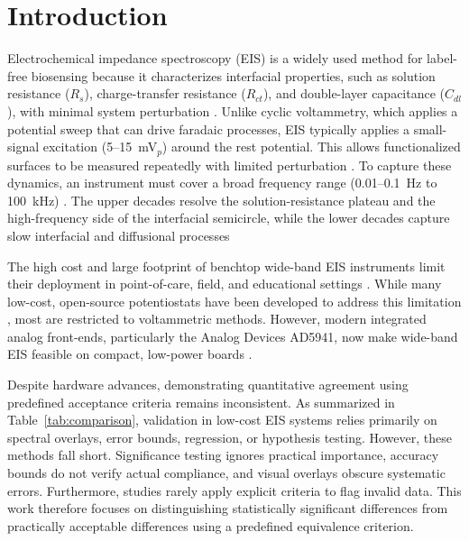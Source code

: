 \section{Introduction}
Electrochemical impedance spectroscopy (EIS) is a widely used method for label-free biosensing \cite{daniels2007label} because it characterizes interfacial properties, such as solution resistance ($R_s$), charge-transfer resistance ($R_{ct}$), and double-layer capacitance ($C_{dl}$), with minimal system perturbation \cite{lisdat2008use}. Unlike cyclic voltammetry, which applies a potential sweep that can drive faradaic processes, EIS typically applies a small-signal excitation (5--15~mV$_p$) around the rest potential. This allows functionalized surfaces to be measured repeatedly with limited perturbation \cite{daniels2007label, magar2021electrochemical}. To capture these dynamics, an instrument must cover a broad frequency range (0.01--0.1~Hz to 100~kHz) \cite{daniels2007label, lisdat2008use, brett2022electrochemical, lazanas2023electrochemical}. The upper decades resolve the solution-resistance plateau and the high-frequency side of the interfacial semicircle, while the lower decades capture slow interfacial and diffusional processes

The high cost and large footprint of benchtop wide-band EIS instruments limit their deployment in point-of-care, field, and educational settings \cite{pruna2018low, burgos2022tbistat, bautista2025helpstat}. While many low-cost, open-source potentiostats have been developed to address this limitation \cite{bill2023electrochemical, rowe2011cheapstat, anshori2025ganestat}, most are restricted to voltammetric methods. However, modern integrated analog front-ends, particularly the Analog Devices AD5941, now make wide-band EIS feasible on compact, low-power boards \cite{bautista2025helpstat, vamos2025hunstat2}.

Despite hardware advances, demonstrating quantitative agreement using predefined acceptance criteria remains inconsistent. As summarized in Table~\ref{tab:comparison}, validation in low-cost EIS systems relies primarily on spectral overlays, error bounds, regression, or hypothesis testing. However, these methods fall short. Significance testing ignores practical importance, accuracy bounds do not verify actual compliance, and visual overlays obscure systematic errors. Furthermore, studies rarely apply explicit criteria to flag invalid data. This work therefore focuses on distinguishing statistically significant differences from practically acceptable differences using a predefined equivalence criterion.

